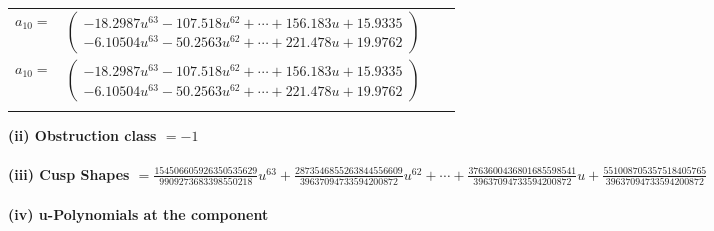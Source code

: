 \documentclass[1p]{elsarticle_modified}
\theoremstyle{definition}
\begin{document}
\begin{tabular}{m{7pt} m{180pt} m{7pt} m{180pt} }
\flushright $a_{10}=$&$\begin{pmatrix}-18.2987 u^{63}-107.518 u^{62}+\cdots+156.183 u+15.9335\\-6.10504 u^{63}-50.2563 u^{62}+\cdots+221.478 u+19.9762\end{pmatrix}$\\ \flushright $a_{10}=$&$\begin{pmatrix}-18.2987 u^{63}-107.518 u^{62}+\cdots+156.183 u+15.9335\\-6.10504 u^{63}-50.2563 u^{62}+\cdots+221.478 u+19.9762\end{pmatrix}$\\&\end{tabular}
\flushleft \textbf{(ii) Obstruction class $= -1$}\\~\\
\flushleft \textbf{(iii) Cusp Shapes $= \frac{154506605926350535629}{9909273683398550218} u^{63}+\frac{2873546855263844556609}{39637094733594200872} u^{62}+\cdots+\frac{3763600436801685598541}{39637094733594200872} u+\frac{551008705357518405765}{39637094733594200872}$}\\~\\
\newpage\renewcommand{\arraystretch}{1}
\flushleft \textbf{(iv) u-Polynomials at the component}\newline \\
\end{document}
